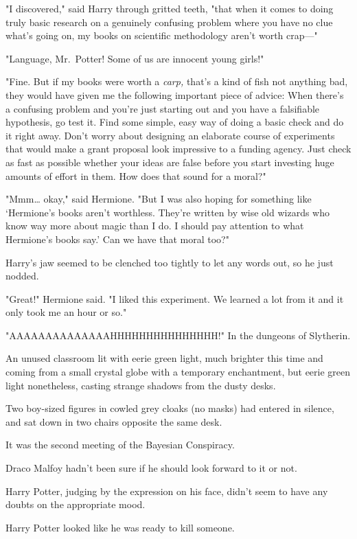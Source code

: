 "I discovered," said Harry through gritted teeth, "that when it comes to doing
truly basic research on a genuinely confusing problem where you have no clue
what's going on, my books on scientific methodology aren't worth crap---"

"Language, Mr.~Potter! Some of us are innocent young girls!"

"Fine. But if my books were worth a \emph{carp,} that's a kind of fish not
anything bad, they would have given me the following important piece of advice:
When there's a confusing problem and you're just starting out and you have a
falsifiable hypothesis, go test it. Find some simple, easy way of doing a basic
check and do it right away. Don't worry about designing an elaborate course of
experiments that would make a grant proposal look impressive to a funding
agency. Just check as fast as possible whether your ideas are false before you
start investing huge amounts of effort in them. How does that sound for a
moral?"

"Mmm{\ldots} okay," said Hermione. "But I was also hoping for something like
`Hermione's books aren't worthless. They're written by wise old wizards who
know way more about magic than I do. I should pay attention to what Hermione's
books say.' Can we have that moral too?"

Harry's jaw seemed to be clenched too tightly to let any words out, so he just
nodded.

"Great!" Hermione said. "I liked this experiment. We learned a lot from it and
it only took me an hour or so."

"AAAAAAAAAAAAAAHHHHHHHHHHHHHHH!"
\later
In the dungeons of Slytherin.

An unused classroom lit with eerie green light, much brighter this time and
coming from a small crystal globe with a temporary enchantment, but eerie green
light nonetheless, casting strange shadows from the dusty desks.

Two boy-sized figures in cowled grey cloaks (no masks) had entered in silence,
and sat down in two chairs opposite the same desk.

It was the second meeting of the Bayesian Conspiracy.

Draco Malfoy hadn't been sure if he should look forward to it or not.

Harry Potter, judging by the expression on his face, didn't seem to have any
doubts on the appropriate mood.

Harry Potter looked like he was ready to kill someone.

